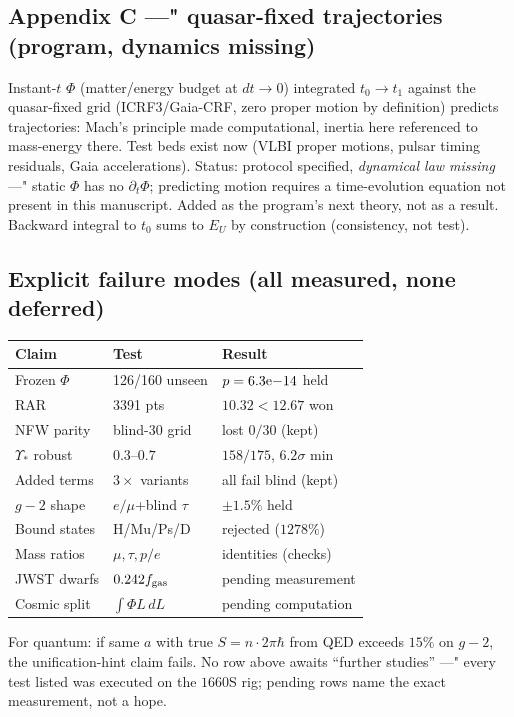 \documentclass[twocolumn]{aastex631}
\begin{document}
\subsection{Appendix C ---" quasar-fixed trajectories (program, dynamics missing)}
Instant-$t$ $\Phi$ (matter/energy budget at $dt\to0$) integrated $t_0\to t_1$ against the quasar-fixed grid (ICRF3/Gaia-CRF, zero proper motion by definition) predicts trajectories: Mach's principle made computational, inertia here referenced to mass-energy there. Test beds exist now (VLBI proper motions, pulsar timing residuals, Gaia accelerations). Status: protocol specified, \emph{dynamical law missing} ---" static $\Phi$ has no $\partial_t\Phi$; predicting motion requires a time-evolution equation not present in this manuscript. Added as the program's next theory, not as a result. Backward integral to $t_0$ sums to $E_U$ by construction (consistency, not test).

\subsection{Explicit failure modes (all measured, none deferred)}
{\small\begin{center}
\setlength{\tabcolsep}{3pt}
\begin{tabular}{lll}
\toprule
Claim & Test & Result \\
\midrule
Frozen $\Phi$ & 126/160 unseen & $p=6.3{\rm e-}14$ held \\
RAR & 3391 pts & $10.32<12.67$ won \\
NFW parity & blind-30 grid & lost $0/30$ (kept) \\
$\Upsilon_*$ robust & $0.3$--$0.7$ & $158/175$, $6.2\sigma$ min \\
Added terms & $3\times$ variants & all fail blind (kept) \\
$g-2$ shape & $e/\mu$+blind $\tau$ & $\pm1.5\%$ held \\
Bound states & H/Mu/Ps/D & rejected ($1278\%$) \\
Mass ratios & $\mu,\tau,p/e$ & identities (checks) \\
JWST dwarfs & $0.242f_{\rm gas}$ & pending measurement \\
Cosmic split & $\int\Phi L\,dL$ & pending computation \\
\bottomrule
\end{tabular}
\end{center}}
For quantum: if same $a$ with true $S=n\cdot2\pi\hbar$ from QED exceeds $15\%$ on $g-2$, the unification-hint claim fails. No row above awaits ``further studies'' ---" every test listed was executed on the $1660$S rig; pending rows name the exact measurement, not a hope.
\end{document}
